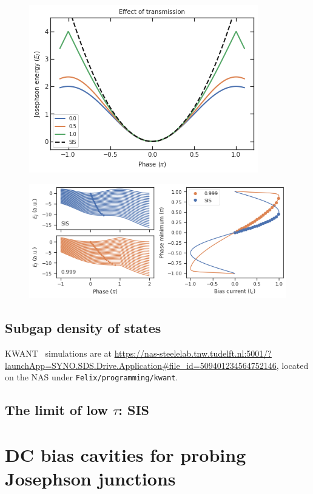 \begin{figure}
	\centering
	\includegraphics[width=0.7\linewidth]{chapter-introduction/figs/EJ_phase_tau}
	\caption{}
	\label{fig:ejphasetau}
\end{figure}

\begin{figure}
	\centering
	\includegraphics[width=0.7\linewidth]{chapter-introduction/figs/EJ_phase_Ib}
	\caption{}
	\label{fig:ejphaseib}
\end{figure}


\subsection{Subgap density of states}

KWANT~\cite{grothKwantSoftwarePackage2014} simulations are at \url{https://nas-steelelab.tnw.tudelft.nl:5001/?launchApp=SYNO.SDS.Drive.Application#file_id=509401234564752146}, located on the NAS under \texttt{Felix/programming/kwant}.

\subsection{The limit of low $\tau$: SIS}



\section{DC bias cavities for probing Josephson junctions}

